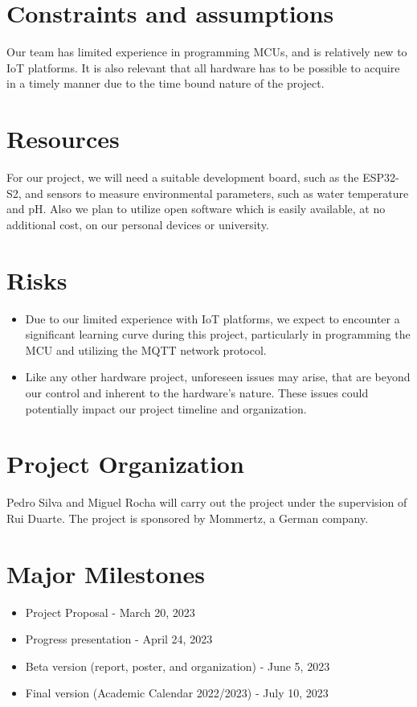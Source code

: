 \documentclass[a4paper,twoside,11pt]{article}
\begin{document}
\section{Constraints and assumptions}
    Our team has limited experience in programming MCUs, and is relatively new to IoT platforms. It is also relevant that all hardware has to be possible to acquire in a timely manner due to the time bound nature of the project.
    
\section{Resources}
    For our project, we will need a suitable development board, such as the ESP32-S2, and sensors to measure environmental parameters, such as water temperature and pH. Also we plan to utilize open software which is easily available, at no additional cost, on our personal devices or university.


\section{Risks}
    \begin{itemize}
        \item Due to our limited experience with IoT platforms, we expect to encounter a significant learning curve during this project, particularly in programming the MCU and utilizing the MQTT network protocol.
        \item Like any other hardware project, unforeseen issues may arise, that are beyond our control and inherent to the hardware's nature. These issues could potentially impact our project timeline and organization.
    \end{itemize}

\section{Project Organization}
Pedro Silva and Miguel Rocha will carry out the project under the supervision of Rui Duarte. The project is sponsored by Mommertz, a German company.

\section{Major Milestones}
    \begin{itemize}
        \item Project Proposal -  March 20, 2023
        \item Progress presentation -  April 24, 2023
        \item Beta version (report, poster, and organization) -  June 5, 2023
        \item Final version (Academic Calendar 2022/2023) -  July 10, 2023 
    \end{itemize}

    


\end{document}
